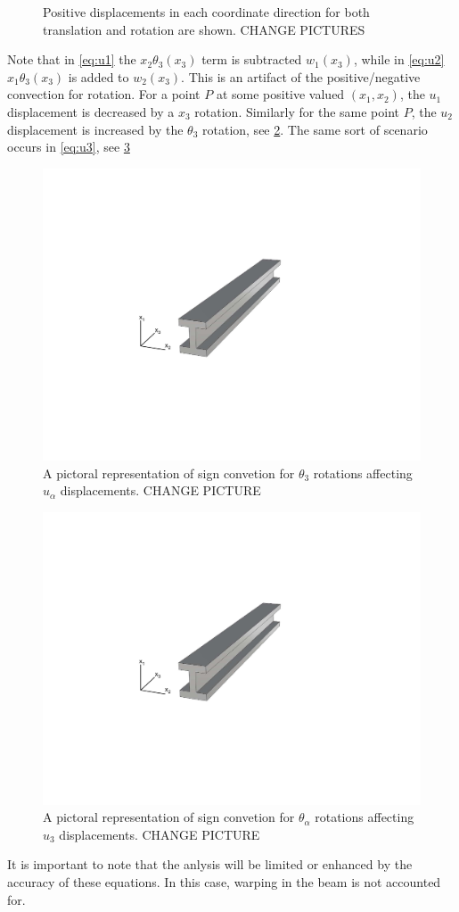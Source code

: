 \begin{figure}
{}
\label{fig:w_theta_displacements}
\caption{Positive displacements in each coordinate direction for both translation and rotation are shown. CHANGE PICTURES}
\end{figure}

Note that in \cref{eq:u1} the $x_2\theta_3(x_3)$ term is subtracted $w_1(x_3)$, while in \cref{eq:u2} $x_1\theta_3(x_3)$ is added to $w_2(x_3)$.
This is an artifact of the positive/negative convection for rotation.
For a point $P$ at some positive valued $(x_1,x_2)$, the $u_1$ displacement is decreased by a $x_3$ rotation.
Similarly for the same point $P$, the $u_2$ displacement is increased by the $\theta_3$ rotation, see \cref{fig:u1u2_plus_minus_xtheta}.
The same sort of scenario occurs in \cref{eq:u3}, see \cref{fig:u3_plus_minus_xtheta}

\begin{figure}
\centering
\includegraphics[width=0.2\columnwidth,trim=4cm 7cm 6cm 6.5cm, clip]{figs/straight.pdf}
\caption{A pictoral representation of sign convetion for $\theta_3$ rotations affecting $u_\alpha$ displacements. CHANGE PICTURE}
\label{fig:u1u2_plus_minus_xtheta}
\end{figure}

\begin{figure}
\centering
\includegraphics[width=0.2\columnwidth,trim=4cm 7cm 6cm 6.5cm, clip]{figs/straight.pdf}
\caption{A pictoral representation of sign convetion for $\theta_\alpha$ rotations affecting $u_3$ displacements. CHANGE PICTURE}
\label{fig:u3_plus_minus_xtheta}
\end{figure}

It is important to note that the anlysis will be limited or enhanced by the accuracy of these equations.
In this case, warping in the beam is not accounted for.
